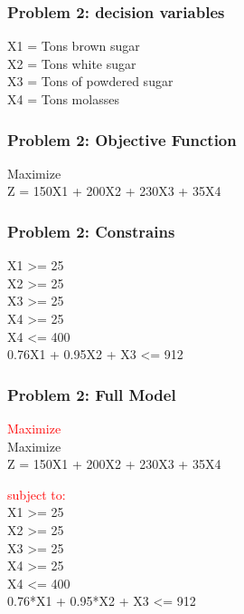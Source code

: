 \documentclass[10pt,svgnames,fragile]{beamer}
\begin{document}



\begin{frame}[label={sec:orge9abdcb}]{}

\frametitle{Problem 2: decision variables }

X1 = Tons brown sugar \\
X2 = Tons white sugar \\
X3 = Tons of powdered sugar \\
X4 = Tons molasses

\end{frame}

\begin{frame}[label={sec:orge9abdcb}]{}

\frametitle{Problem 2: Objective Function }
Maximize\\[1em]

Z =  150X1 + 200X2 + 230X3 + 35X4


\end{frame}

\begin{frame}[label={sec:orge9abdcb}]{}

\frametitle{Problem 2: Constrains }
	X1 >= 25\\
	X2 >= 25\\
	X3 >= 25\\
	X4 >= 25\\
	X4 <= 400\\
	
	0.76X1 + 0.95X2 + X3 <= 912


\end{frame}

\begin{frame}[label={sec:orge9abdcb}]{}

\frametitle{Problem 2: Full Model }
\textcolor{red}{Maximize}\\

Maximize\\[1em]

Z =  150X1 + 200X2 + 230X3 + 35X4


\textcolor{red}{subject to:}\\
	X1 >= 25\\
	X2 >= 25\\
	X3 >= 25\\
	X4 >= 25\\
	X4 <= 400\\
	
	0.76*X1 + 0.95*X2 + X3 <= 912

\end{frame}
\end{document}
